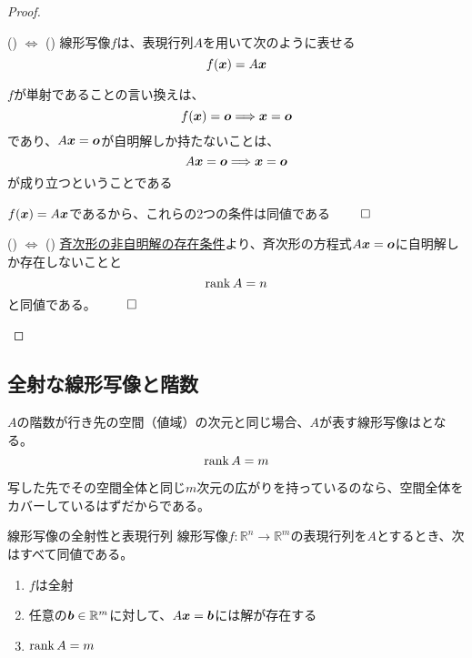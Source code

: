 \documentclass[../../../topic_linear-algebra]{subfiles}
\begin{document}
\begin{proof}
  \begin{subpattern}{() $\Longleftrightarrow$ ()}
    線形写像$f$は、表現行列$A$を用いて次のように表せる
    \begin{equation*}
      f(\vb*{x}) = A\vb*{x}
    \end{equation*}

    $f$が単射であることの言い換えは、
    \begin{equation*}
      f(\vb*{x}) = \vb*{o} \Longrightarrow \vb*{x} = \vb*{o}
    \end{equation*}
    であり、$A\vb*{x} = \vb*{o}$が自明解しか持たないことは、
    \begin{equation*}
      A\vb*{x} = \vb*{o} \Longrightarrow \vb*{x} = \vb*{o}
    \end{equation*}
    が成り立つということである

    $f(\vb*{x}) = A\vb*{x}$であるから、これらの2つの条件は同値である $\qed$
  \end{subpattern}

  \begin{subpattern}{() $\Longleftrightarrow$ ()}
    \hyperref[thm:homogeneous-trivial-iff-full-col-rank]{斉次形の非自明解の存在条件}より、斉次形の方程式$A\vb*{x} = \vb*{o}$に自明解しか存在しないことと
    \begin{equation*}
      \rank A = n
    \end{equation*}
    と同値である。 $\qed$
  \end{subpattern}
\end{proof}

\subsection{全射な線形写像と階数}

$A$の階数が行き先の空間（値域）の次元と同じ場合、$A$が表す線形写像はとなる。
\begin{equation*}
  \rank A = m
\end{equation*}

写した先でその空間全体と同じ$m$次元の広がりを持っているのなら、空間全体をカバーしているはずだからである。

\begin{theorem*}{線形写像の全射性と表現行列}
  線形写像$f\colon \mathbb{R}^n \to \mathbb{R}^m$の表現行列を$A$とするとき、次はすべて同値である。
  \begin{enumerate}[label=\romanlabel]
    \item $f$は全射
    \item 任意の$\vb*{b} \in \mathbb{R}^m$に対して、$A\vb*{x} = \vb*{b}$には解が存在する
    \item $\rank A = m$
  \end{enumerate}
\end{theorem*}
\end{document}
